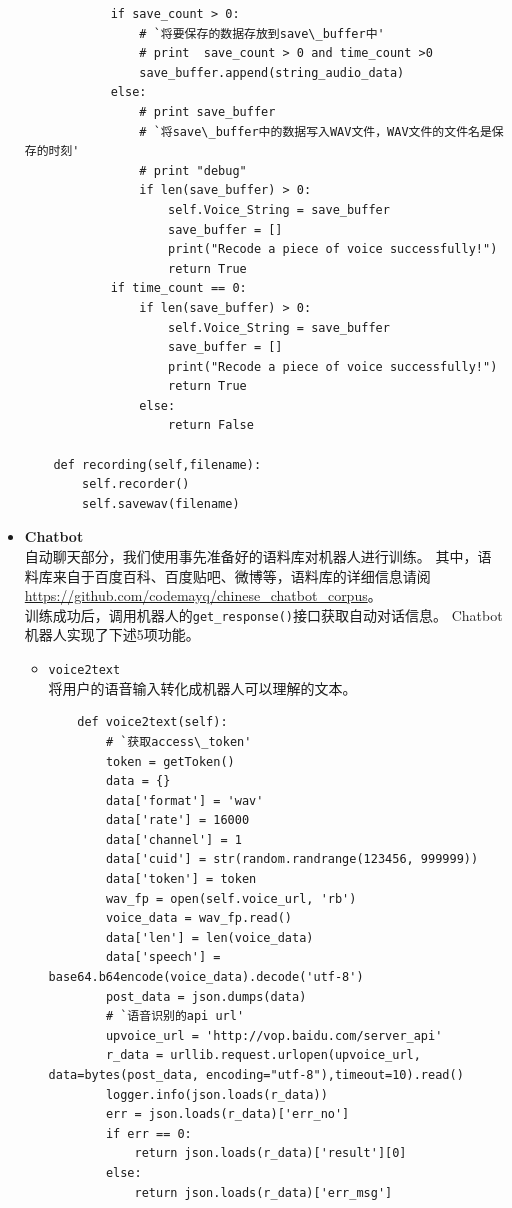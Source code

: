 \documentclass[logo,reportComp]{thesis}
\begin{document}
\begin{itemize}
\begin{lstlisting}
            if save_count > 0:
                # `将要保存的数据存放到save\_buffer中'
                # print  save_count > 0 and time_count >0
                save_buffer.append(string_audio_data)
            else:
                # print save_buffer
                # `将save\_buffer中的数据写入WAV文件，WAV文件的文件名是保存的时刻'
                # print "debug"
                if len(save_buffer) > 0:
                    self.Voice_String = save_buffer
                    save_buffer = []
                    print("Recode a piece of voice successfully!")
                    return True
            if time_count == 0:
                if len(save_buffer) > 0:
                    self.Voice_String = save_buffer
                    save_buffer = []
                    print("Recode a piece of voice successfully!")
                    return True
                else:
                    return False

    def recording(self,filename):
        self.recorder()
        self.savewav(filename)
\end{lstlisting}
    
    \item \textbf{Chatbot}\\
    自动聊天部分，我们使用事先准备好的语料库对机器人进行训练。
    其中，语料库来自于百度百科、百度贴吧、微博等，语料库的详细信息请阅\url{https://github.com/codemayq/chinese\_chatbot\_corpus}。\\
    
    训练成功后，调用机器人的\verb'get_response()'接口获取自动对话信息。
    Chatbot机器人实现了下述5项功能。
    \begin{itemize}
        \item \verb'voice2text'\\
        将用户的语音输入转化成机器人可以理解的文本。
\begin{lstlisting}
    def voice2text(self):
        # `获取access\_token'
        token = getToken()
        data = {}
        data['format'] = 'wav'
        data['rate'] = 16000
        data['channel'] = 1
        data['cuid'] = str(random.randrange(123456, 999999))
        data['token'] = token
        wav_fp = open(self.voice_url, 'rb')
        voice_data = wav_fp.read()
        data['len'] = len(voice_data)
        data['speech'] = base64.b64encode(voice_data).decode('utf-8')
        post_data = json.dumps(data)
        # `语音识别的api url'
        upvoice_url = 'http://vop.baidu.com/server_api'
        r_data = urllib.request.urlopen(upvoice_url, data=bytes(post_data, encoding="utf-8"),timeout=10).read()
        logger.info(json.loads(r_data))
        err = json.loads(r_data)['err_no']
        if err == 0:
            return json.loads(r_data)['result'][0]
        else:
            return json.loads(r_data)['err_msg']
\end{lstlisting}
        

\end{itemize}
\end{itemize}
\end{document}
